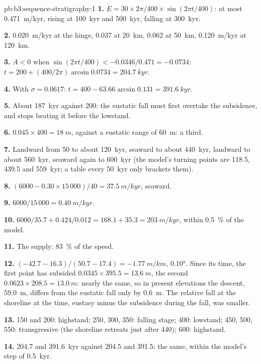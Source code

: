 \begin{solution}{pb:b3:sequence-stratigraphy:1}
\textbf{1.} $\dot E = 30\times2\pi/400\times\sin(2\pi t/400)$: at most
\qty{0.471}{m/kyr}, rising at \qty{100}{kyr} and \qty{500}{kyr}, falling at
\qty{300}{kyr}.

\textbf{2.} \qty{0.020}{m/kyr} at the hinge, 0.037 at \qty{20}{km}, 0.062 at
\qty{50}{km}, \qty{0.120}{m/kyr} at \qty{120}{km}.

\textbf{3.} $A < 0$ when $\sin(2\pi t/400) < -0.0346/0.471 = -0.0734$: $t =
200 + (400/2\pi)\arcsin0.0734 = \qty{204.7}{kyr}$.

\textbf{4.} With $\sigma = 0.0617$: $t = 400 - 63.66\arcsin0.131 =
\qty{391.6}{kyr}$.

\textbf{5.} About \qty{187}{kyr} against 200: the eustatic fall must first
overtake the subsidence, and stops beating it before the lowstand.

\textbf{6.} $0.045\times400 = \qty{18}{m}$, against a eustatic range of
\qty{60}{m}: a third.

\textbf{7.} Landward from 50 to about \qty{120}{kyr}, seaward to about
\qty{440}{kyr}, landward to about \qty{560}{kyr}, seaward again to
\qty{600}{kyr} (the model's turning points are 118.5, 439.5 and
\qty{559}{kyr}; a table every \qty{50}{kyr} only brackets them).

\textbf{8.} $(6000 - 0.30\times15\,000)/40 = \qty{37.5}{m/kyr}$, seaward.

\textbf{9.} $6000/15\,000 = \qty{0.40}{m/kyr}$.

\textbf{10.} $6000/35.7 + 0.424/0.012 = 168.1 + 35.3 = \qty{203}{m/kyr}$,
within \qty{0.5}{\percent} of the model.

\textbf{11.} The supply: \qty{83}{\percent} of the speed.

\textbf{12.} $(-42.7 - 16.3)/(50.7 - 17.4) = \qty{-1.77}{m/km}$, \ang{0.10}.
Since its time, the first point has subsided $0.0345\times395.5 =
\qty{13.6}{m}$, the second $0.0623\times208.5 = \qty{13.0}{m}$: nearly the
same, so in present elevations the descent, \qty{59.0}{m}, differs from the
eustatic fall only by \qty{0.6}{m}. The relative fall at the shoreline at
the time, eustasy minus the subsidence during the fall, was smaller.

\textbf{13.} 150 and 200: highstand; 250, 300, 350: falling stage; 400:
lowstand; 450, 500, 550: transgressive (the shoreline retreats just after
440); 600: highstand.

\textbf{14.} 204.7 and \qty{391.6}{kyr} against 204.5 and 391.5: the same,
within the model's step of \qty{0.5}{kyr}.


\end{solution}
